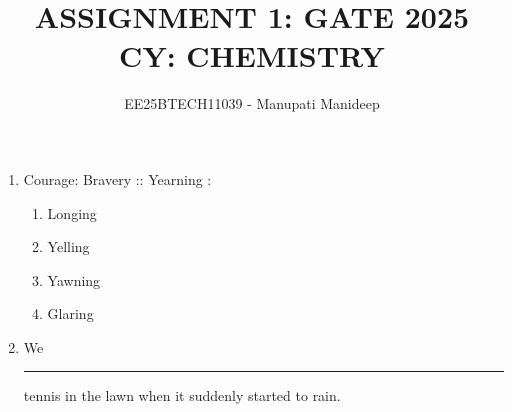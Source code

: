 \documentclass[journal,12pt,onecolumn]{IEEEtran}
\theoremstyle{remark}
\begin{document}
\title{
ASSIGNMENT 1: GATE 2025 \\
CY: CHEMISTRY}
\author{EE25BTECH11039 - Manupati Manideep}
\maketitle
\renewcommand{\thefigure}{\theenumi}
\renewcommand{\thetable}{\theenumi}
\begin{enumerate}
\section*{Q.1 - Q.5 carry one mark each}
\item Courage: Bravery :: Yearning :
    \begin{enumerate}
        \item Longing
        \item Yelling
        \item Yawning
        \item Glaring
    \end{enumerate}    
    \hfill{}
  




\item We \rule{2cm}{0.15mm} tennis in the lawn when it suddenly started to rain.
    \begin{enumerate}
    \end{enumerate}     
    \hfill{}
    




\end{enumerate}
\end{document}

